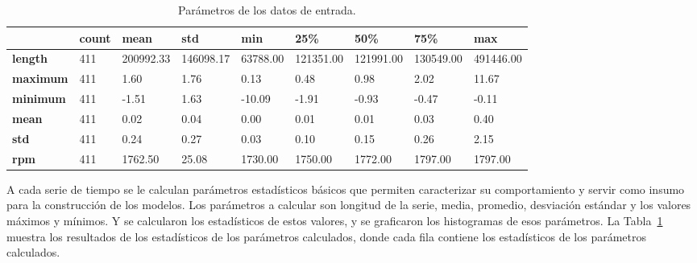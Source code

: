 \documentclass[11pt,a4paper,spanish]{book}
\numberwithin{equation}{chapter}
\numberwithin{figure}{chapter}
\begin{document}
\begin{table}[h]
\centering
\renewcommand{\arraystretch}{1.2}
\footnotesize
\begin{tabularx}{\textwidth}{|l|X|X|X|X|X|X|X|X|}
    \hline
    \textbf{ } & \textbf{count} & \textbf{mean} & \textbf{std} & \textbf{min} & \textbf{25\%} & \textbf{50\%} & \textbf{75\%} & \textbf{max} \\
    \hline
    \textbf{length} & 411 & 200992.33 & 146098.17 & 63788.00 & 121351.00 & 121991.00 & 130549.00 & 491446.00 \\
    \hline
    \textbf{maximum} & 411 & 1.60 & 1.76 & 0.13 & 0.48 & 0.98 & 2.02 & 11.67 \\
    \hline
    \textbf{minimum} & 411 & -1.51 & 1.63 & -10.09 & -1.91 & -0.93 & -0.47 & -0.11 \\
    \hline
    \textbf{mean} & 411 & 0.02 & 0.04 & 0.00 & 0.01 & 0.01 & 0.03 & 0.40 \\
    \hline
    \textbf{std} & 411 & 0.24 & 0.27 & 0.03 & 0.10 & 0.15 & 0.26 & 2.15 \\
    \hline
    \textbf{rpm} & 411 & 1762.50 & 25.08 & 1730.00 & 1750.00 & 1772.00 & 1797.00 & 1797.00 \\
    \hline
\end{tabularx}
\caption{Parámetros de los datos de entrada.}
\label{tab:stats}
\end{table}



A cada serie de tiempo se le calculan parámetros estadísticos básicos que permiten caracterizar su comportamiento y servir como insumo para la construcción de los modelos. Los parámetros a calcular son longitud de la serie, media, promedio, desviación estándar y los valores máximos y mínimos. Y se calcularon los estadísticos de estos valores, y se graficaron los histogramas de esos parámetros. La Tabla~\ref{tab:stats} muestra los resultados de los estadísticos de los parámetros calculados, donde cada fila contiene los estadísticos de los parámetros calculados. 
\end{document}
